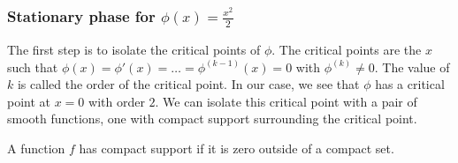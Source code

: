 \subsubsection{Stationary phase for $\phi(x) = \frac{x^2}{2}$}
The first step is to isolate the critical points of $\phi$. The critical points are the $x$ such that $\phi(x) = \phi'(x) = \ldots = \phi^{(k-1)}(x) = 0$ with $\phi^{(k)} \neq 0$. The value of $k$ is called the order of the critical point. In our case, we see that $\phi$ has a critical point at $x = 0$ with order $2$.
We can isolate this critical point with a pair of smooth functions, one with compact support surrounding the critical point.

\begin{definition}
	A function $f$ has compact support if it is zero outside of a compact set.
\end{definition}

